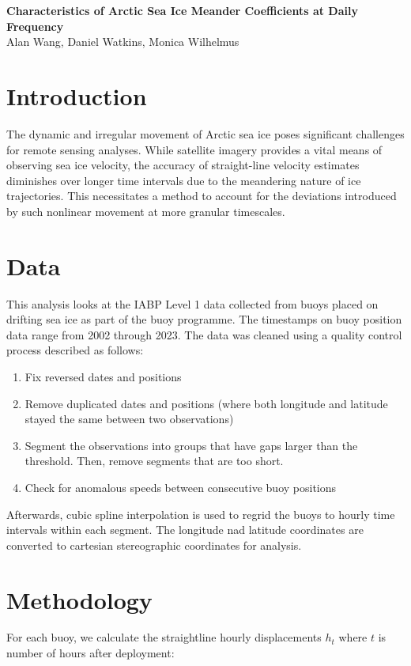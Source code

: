 \documentclass[12pt]{article}
\newcommand{\be}{\begin{enumerate}}
\newcommand{\ee}{\end{enumerate}}
\begin{document}
\begin{center}
    \onehalfspacing
    \Large{\textbf{Characteristics of Arctic Sea Ice Meander Coefficients at Daily Frequency}}
\vspace{0.4cm}
\normalsize
\\ Alan Wang, Daniel Watkins, Monica Wilhelmus \\
\vspace{0.4cm}
\normalsize
\end{center}

\begin{multicols}{2}
\section{Introduction}
The dynamic and irregular movement of Arctic sea ice poses significant challenges 
for remote sensing analyses. While satellite imagery provides a vital means of 
observing sea ice velocity, the accuracy of straight-line velocity estimates 
diminishes over longer time intervals due to the meandering nature of ice trajectories. 
This necessitates a method to account for the deviations introduced by such nonlinear 
movement at more granular timescales.

\section{Data}
This analysis looks at the IABP Level 1 data collected from buoys placed on drifting sea ice 
as part of the buoy programme. The timestamps on buoy position data range from 2002 through 
2023. The data was cleaned using a quality control process described as follows:
\be[itemsep=-0.1cm, leftmargin=0.7cm]
    \item Fix reversed dates and positions
    \item Remove duplicated dates and positions (where both longitude and latitude stayed the 
        same between two observations)
    \item Segment the observations into groups that have gaps larger than the threshold. 
        Then, remove segments that are too short.
    \item Check for anomalous speeds between consecutive buoy positions
\ee
Afterwards, cubic spline interpolation is used to regrid the buoys to hourly time intervals within each segment.
The longitude nad latitude coordinates are converted to cartesian stereographic coordinates for analysis.

\section{Methodology}
For each buoy, we calculate the straightline hourly displacements $h_t$ where $t$ is number of hours after deployment:


\end{multicols}
\end{document}
